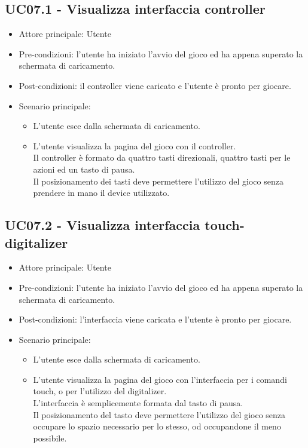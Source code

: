 \subsection{UC07.1 - Visualizza interfaccia controller}
\begin{itemize}
    \item Attore principale: Utente
    \item Pre-condizioni: l'utente ha iniziato l'avvio del gioco ed ha appena superato la schermata di caricamento.
    \item Post-condizioni: il controller viene caricato e l'utente è pronto per giocare.
    \item Scenario principale: \begin{itemize}
        \item L'utente esce dalla schermata di caricamento.
        \item L'utente visualizza la pagina del gioco con il controller.\\ Il controller è formato da quattro tasti direzionali, quattro tasti per le azioni ed un tasto di pausa.\\ Il posizionamento dei tasti deve permettere l'utilizzo del gioco senza prendere in mano il device utilizzato.
    \end{itemize}
\end{itemize}

\subsection{UC07.2 - Visualizza interfaccia touch-digitalizer}
\begin{itemize}
    \item Attore principale: Utente
    \item Pre-condizioni: l'utente ha iniziato l'avvio del gioco ed ha appena superato la schermata di caricamento.
    \item Post-condizioni: l'interfaccia viene caricata e l'utente è pronto per giocare.
    \item Scenario principale: \begin{itemize}
        \item L'utente esce dalla schermata di caricamento.
        \item L'utente visualizza la pagina del gioco con l'interfaccia per i comandi touch, o per l'utilizzo del digitalizer.\\ L'interfaccia è semplicemente formata dal tasto di pausa.\\ Il posizionamento del tasto deve permettere l'utilizzo del gioco senza occupare lo spazio necessario per lo stesso, od occupandone il meno possibile.
    \end{itemize}
\end{itemize}

